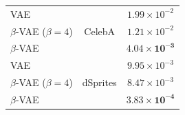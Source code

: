 \documentclass[a0]{a0poster}
\begin{document}
\begin{minipage}[t]{0.32\textwidth}
\begin{minipage}{\columnwidth}
\begin{tabular}{|>{\centering}m{10cm}|c|c|}
          \hline
          VAE &  & $1.99 \times 10^{-2}$\\
          $\beta$-VAE ($\beta = 4$) & CelebA & $1.21 \times 10^{-2}$\\
          $\beta$-VAE \cite{higgins2016beta} &  &  $\mathbf{4.04\times 10^{-3}}$\\
          \hline
         VAE &  & $9.95 \times 10^{-3}$\\
          $\beta$-VAE ($\beta = 4$) & dSprites &  $8.47 \times 10^{-3}$\\
          $\beta$-VAE \cite{higgins2016beta} &  & $\mathbf{3.83 \times 10^{-4}}$\\
          \hline
      \end{tabular}
      \vspace{1cm}
\end{minipage}
\end{minipage}
\hfill
\end{document}
